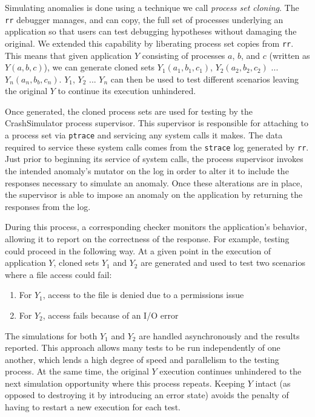 
Simulating anomalies
is done using
a technique
we call {\it process set cloning}.
The {\tt rr} debugger manages,
and can copy,
the full set of processes underlying an application
so that users can test debugging
hypotheses without damaging the original.
We extended this capability
by liberating process set copies from {\tt rr}.
This means that given application $Y$
consisting of processes $a$, $b$, and $c$
(written as $Y(a, b, c)$),
we can generate cloned sets $Y_1(a_1, b_1, c_1)$,
$Y_2(a_2, b_2, c_2)$ ... $Y_n(a_n, b_b, c_n)$.
$Y_1$, $Y_2$ ... $Y_n$ can then be used to test different scenarios leaving
the original $Y$ to continue its execution unhindered.

Once generated, the cloned process sets are used
for testing by the CrashSimulator process supervisor.
This supervisor is responsible for attaching to a process set
via {\tt ptrace} and
servicing any system calls it makes.
The data required to service these system calls
comes from the  {\tt strace} log
generated by {\tt rr}.
Just prior to beginning its service of system calls,
the process supervisor invokes the intended anomaly's mutator
on the log in order to alter it to include the responses
necessary to simulate an anomaly.
Once these alterations are in place,
the supervisor is able to impose an anomaly
on the application by returning the responses from the log.

During this process,
a corresponding checker
monitors the application's behavior,
allowing it to report on the correctness of the response.
For example, testing could proceed in the following way.
At a given point in the execution of application $Y$,
cloned sets $Y_1$ and $Y_2$ are generated and
used to test two scenarios where a file access could fail:
\begin{enumerate}
    \item{For $Y_1$, access to the file is denied due to a permissions issue}
    \item{For $Y_2$, access fails because of an I/O error}
\end{enumerate}
The simulations for both $Y_1$ and $Y_2$ are handled asynchronously and
the results reported.
This approach allows many tests to be run independently of one another,
which lends a
high degree of speed and
parallelism to the testing process.
At the same time, the original $Y$ execution continues unhindered to the
next simulation opportunity where this process repeats.
Keeping $Y$ intact
(as opposed to destroying it by introducing an error state)
avoids the penalty
of having to restart a new execution for each test.

